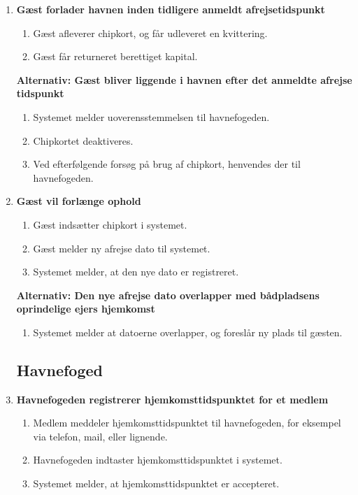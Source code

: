 \begin{enumerate}
    \item{\bf{Gæst forlader havnen inden tidligere anmeldt afrejsetidspunkt}}
      \begin{enumerate}
        \item Gæst afleverer chipkort, og får udleveret en kvittering.
        \item Gæst får returneret berettiget kapital.
      \end{enumerate}

    \bf{Alternativ: Gæst bliver liggende i havnen efter det anmeldte afrejse tidspunkt}
      \begin{enumerate}
        \item Systemet melder uoverensstemmelsen til havnefogeden.
        \item Chipkortet deaktiveres.
        \item Ved efterfølgende forsøg på brug af chipkort, henvendes der til havnefogeden.
      \end{enumerate}

    \item{\bf{Gæst vil forlænge ophold}}
      \begin{enumerate}
        \item Gæst indsætter chipkort i systemet.
        \item Gæst melder ny afrejse dato til systemet.
        \item Systemet melder, at den nye dato er registreret.
      \end{enumerate}

    \bf{Alternativ: Den nye afrejse dato overlapper med bådpladsens oprindelige ejers hjemkomst}
      \begin{enumerate}
        \item Systemet melder at datoerne overlapper, og foreslår ny plads til gæsten.
      \end{enumerate}

\subsection{Havnefoged}
    \item{\bf{Havnefogeden registrerer hjemkomsttidspunktet for et medlem}}
      \begin{enumerate}
        \item Medlem meddeler hjemkomsttidspunktet til havnefogeden, for eksempel via telefon, mail, eller lignende.
        \item Havnefogeden indtaster hjemkomsttidspunktet i systemet.
        \item Systemet melder, at hjemkomsttidspunktet er accepteret.
      \end{enumerate}
  

\end{enumerate}
